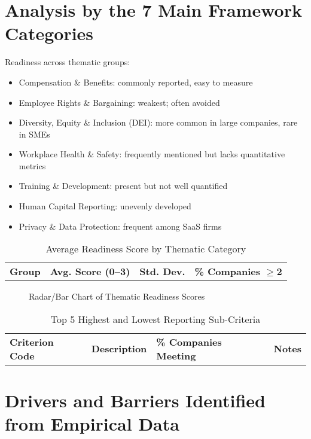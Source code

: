 \section{Analysis by the 7 Main Framework Categories}
Readiness across thematic groups:
\begin{itemize}
    \item Compensation \& Benefits: commonly reported, easy to measure
    \item Employee Rights \& Bargaining: weakest; often avoided
    \item Diversity, Equity \& Inclusion (DEI): more common in large companies, rare in SMEs
    \item Workplace Health \& Safety: frequently mentioned but lacks quantitative metrics
    \item Training \& Development: present but not well quantified
    \item Human Capital Reporting: unevenly developed
    \item Privacy \& Data Protection: frequent among SaaS firms
\end{itemize}

\begin{table}[H]
    \centering
    \caption{Average Readiness Score by Thematic Category}
    \begin{tabular}{l l l l}
        \textbf{Group} & \textbf{Avg. Score (0--3)} & \textbf{Std. Dev.} & \textbf{\% Companies $\geq$2} \\
    \end{tabular}
\end{table}

\begin{figure}[H]
    \centering
    \caption{Radar/Bar Chart of Thematic Readiness Scores}
\end{figure}

\begin{table}[H]
    \centering
    \caption{Top 5 Highest and Lowest Reporting Sub-Criteria}
    \begin{tabular}{l l l l}
        \textbf{Criterion Code} & \textbf{Description} & \textbf{\% Companies Meeting} & \textbf{Notes} \\
    \end{tabular}
\end{table}

\section{Drivers and Barriers Identified from Empirical Data}
